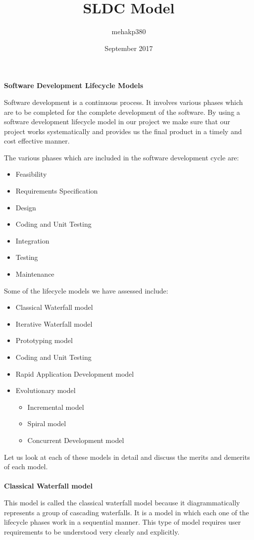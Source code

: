 \documentclass{article}
\title{SLDC Model}
\author{mehakp380 }
\date{September 2017}
\begin{document}
\begin{center}
    \large{\textbf{Software Development Lifecycle Models}}
\end{center}

Software development is a continuous process. It involves various phases which are to be completed for the complete development of the software. By using a software development lifecycle model in our project we make sure that our project works systematically and provides us the final product in a timely and cost effective manner.

The various phases which are included in the software development cycle are:
\begin{itemize}
    \item 	Feasibility
    \item 	Requirements Specification
    \item 	Design
    \item Coding and Unit Testing
    \item 	Integration 
    \item Testing
    \item Maintenance
\end{itemize}
Some of the lifecycle models we have assessed include:
\begin{itemize}
    \item 	Classical Waterfall model
    \item 	Iterative Waterfall model
    \item Prototyping model
    \item Coding and Unit Testing
    \item Rapid Application Development model
    \item 	Evolutionary model
    \begin{itemize}
    \item  Incremental model
    \item Spiral model
    \item Concurrent Development model 

\end{itemize}
\end{itemize}


Let us look at each of these models in detail and discuss the merits and demerits of each model.\\
\vspace{2cm}
\\\large{\textbf{Classical Waterfall model}}

This model is called the classical waterfall model because it diagrammatically represents a group of cascading waterfalls. It is a model in which each one of the lifecycle phases work in a sequential manner. This type of model requires user requirements to be understood very clearly and explicitly.\\
\end{document}
